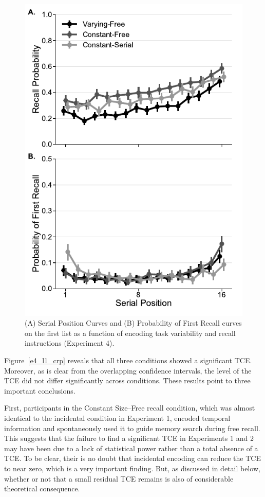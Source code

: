\documentclass[man,natbib,floatsintext]{apa6} %
\begin{document}
\begin{figure}
\includegraphics{figures/E4_spc_list1.pdf}
\caption{(A) Serial Position Curves and (B) Probability of First Recall curves on the first list as a function of encoding task variability and recall instructions (Experiment 4). \spcpaneltext}
\label{e4_l1_spc}
\end{figure}

Figure~\ref{e4_l1_crp} reveals that all three conditions showed a significant TCE. Moreover, as is clear from the overlapping confidence intervals, the level of the TCE did not differ significantly across conditions. These results point to three important conclusions. 

First, participants in the Constant Size--Free recall condition, which was almost identical to the incidental condition in Experiment 1, encoded temporal information and spontaneously used it to guide memory search during free recall. This suggests that the failure to find a significant TCE in Experiments 1 and 2 may have been due to a lack of statistical power rather than a total absence of a TCE. To be clear, their is no doubt that incidental encoding can reduce the TCE to near zero, which is a very important finding. But, as discussed in detail below, whether or not that a small residual TCE remains is also of considerable theoretical consequence.
\end{document}

